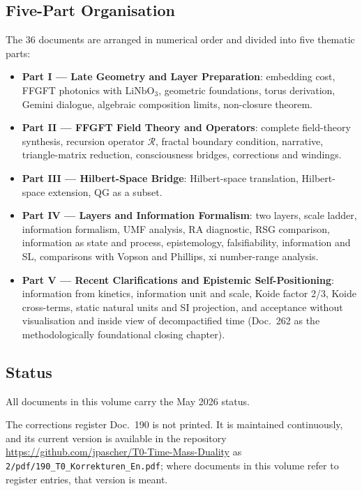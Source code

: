 \subsection*{Five-Part Organisation}

The 36 documents are arranged in numerical order and divided into five
thematic parts:

\begin{itemize}
\item \textbf{Part I --- Late Geometry and Layer Preparation}: embedding
      cost, FFGFT photonics with $\mathrm{LiNbO}_3$, geometric foundations,
      torus derivation, Gemini dialogue, algebraic
      composition limits, non-closure theorem.
\item \textbf{Part II --- FFGFT Field Theory and Operators}: complete
      field-theory synthesis, recursion operator $\mathcal{R}$, fractal
      boundary condition, narrative, triangle-matrix reduction, consciousness
      bridges, corrections and windings.
\item \textbf{Part III --- Hilbert-Space Bridge}: Hilbert-space translation,
      Hilbert-space extension, QG as a subset.
\item \textbf{Part IV --- Layers and Information Formalism}: two layers,
      scale ladder, information formalism, UMF analysis, RA diagnostic,
      RSG comparison, information as state and process, epistemology,
      falsifiability, information and SL, comparisons with Vopson and
      Phillips, xi number-range analysis.
\item \textbf{Part V --- Recent Clarifications and Epistemic
      Self-Positioning}: information from kinetics, information unit and
      scale, Koide factor 2/3, Koide cross-terms, static natural units and
      SI projection, and acceptance without visualisation and inside view of
      decompactified time (Doc.~262 as the methodologically foundational
      closing chapter).
\end{itemize}

\subsection*{Status}

All documents in this volume carry the May 2026 status.

The corrections register Doc.~190 is not printed. It is maintained
continuously, and its current version is available in the repository
\url{https://github.com/jpascher/T0-Time-Mass-Duality} as
\texttt{2/pdf/190\_T0\_Korrekturen\_En.pdf}; where documents in this
volume refer to register entries, that version is meant.

